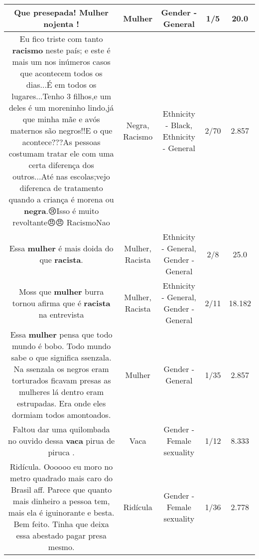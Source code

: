 \documentclass[11pt]{article}
\newlength\mylength
\begin{document}
\begin{center}
\begin{longtable}{|C{.65\mylength}|C{.30\mylength}|C{.12\mylength}|C{.12\mylength}|C{.12\mylength}|}
  \small Que presepada! \textbf{Mulher} nojenta !\normalsize   & Mulher & Gender - General & 1/5 & 20.0 \\  \hline
  \small Eu fico triste com tanto \textbf{racismo}  neste país; e este  é  mais um nos inúmeros  casos  que acontecem todos os dias...É em todos os lugares...Tenho 3 filhos,e um deles é um moreninho  lindo,já que minha mãe e avós maternos são  negros!!E o que acontece???As pessoas  costumam  tratar  ele com uma certa diferença  dos outros...Até nas escolas;vejo diferenca de tratamento quando a criança é morena ou \textbf{negra}.😢Isso  é  muito revoltante😠😠 RacismoNao\normalsize   & Negra, Racismo & Ethnicity - Black, Ethnicity - General & 2/70 & 2.857 \\  \hline
  \small Essa \textbf{mulher} é mais doida do que \textbf{racista}.\normalsize   & Mulher, Racista & Ethnicity - General, Gender - General & 2/8 & 25.0 \\  \hline
  \small Moss que \textbf{mulher} burra tornou afirma que é \textbf{racista} na entrevista\normalsize   & Mulher, Racista & Ethnicity - General, Gender - General & 2/11 & 18.182 \\  \hline
  \small Essa \textbf{mulher}  pensa que todo mundo é bobo. Todo mundo sabe o que significa ssenzala. Na ssenzala os  negros  eram torturados  ficavam presas as mulheres lá dentro eram estrupadas. Era onde eles dormiam todos amontoados.\normalsize   & Mulher & Gender - General & 1/35 & 2.857 \\  \hline
  \small Faltou dar uma quilombada no ouvido dessa \textbf{vaca} pirua de piruca .\normalsize   & Vaca & Gender - Female sexuality & 1/12 & 8.333 \\  \hline
  \small Ridícula. Oooooo eu moro no metro quadrado mais caro do Brasil aff.  Parece que quanto mais dinheiro a pessoa tem, mais ela é iguinorante e besta. Bem feito. Tinha que deixa essa abestado pagar presa mesmo.\normalsize   & Ridícula & Gender - Female sexuality & 1/36 & 2.778 \\  \hline

\end{longtable}
\end{center}
\end{document}
